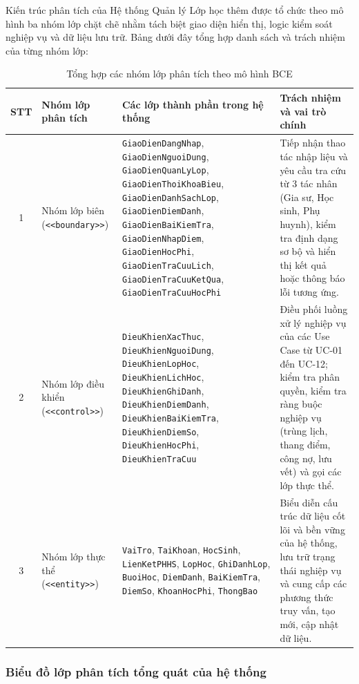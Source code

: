 \documentclass[12pt,a4paper]{article}
\begin{document}
Kiến trúc phân tích của Hệ thống Quản lý Lớp học thêm được tổ chức theo mô hình ba nhóm lớp chặt chẽ nhằm tách biệt giao diện hiển thị, logic kiểm soát nghiệp vụ và dữ liệu lưu trữ. Bảng dưới đây tổng hợp danh sách và trách nhiệm của từng nhóm lớp:

\begin{table}[htbp]
\centering
\caption{Tổng hợp các nhóm lớp phân tích theo mô hình BCE}
\begin{tabularx}{\textwidth}{@{}c >{\raggedright\arraybackslash}p{3.0cm} >{\raggedright\arraybackslash}X >{\raggedright\arraybackslash}X@{}}
\toprule
\textbf{STT} & \textbf{Nhóm lớp phân tích} & \textbf{Các lớp thành phần trong hệ thống} & \textbf{Trách nhiệm và vai trò chính} \\
\midrule
1 & Nhóm lớp biên (\texttt{<<boundary>>}) & \texttt{GiaoDienDangNhap}, \texttt{GiaoDienNguoiDung}, \texttt{GiaoDienQuanLyLop}, \texttt{GiaoDienThoiKhoaBieu}, \texttt{GiaoDienDanhSachLop}, \texttt{GiaoDienDiemDanh}, \texttt{GiaoDienBaiKiemTra}, \texttt{GiaoDienNhapDiem}, \texttt{GiaoDienHocPhi}, \texttt{GiaoDienTraCuuLich}, \texttt{GiaoDienTraCuuKetQua}, \texttt{GiaoDienTraCuuHocPhi} & Tiếp nhận thao tác nhập liệu và yêu cầu tra cứu từ 3 tác nhân (Gia sư, Học sinh, Phụ huynh), kiểm tra định dạng sơ bộ và hiển thị kết quả hoặc thông báo lỗi tương ứng. \\
\midrule
2 & Nhóm lớp điều khiển (\texttt{<<control>>}) & \texttt{DieuKhienXacThuc}, \texttt{DieuKhienNguoiDung}, \texttt{DieuKhienLopHoc}, \texttt{DieuKhienLichHoc}, \texttt{DieuKhienGhiDanh}, \texttt{DieuKhienDiemDanh}, \texttt{DieuKhienBaiKiemTra}, \texttt{DieuKhienDiemSo}, \texttt{DieuKhienHocPhi}, \texttt{DieuKhienTraCuu} & Điều phối luồng xử lý nghiệp vụ của các Use Case từ UC-01 đến UC-12; kiểm tra phân quyền, kiểm tra ràng buộc nghiệp vụ (trùng lịch, thang điểm, công nợ, lưu vết) và gọi các lớp thực thể. \\
\midrule
3 & Nhóm lớp thực thể (\texttt{<<entity>>}) & \texttt{VaiTro}, \texttt{TaiKhoan}, \texttt{HocSinh}, \texttt{LienKetPHHS}, \texttt{LopHoc}, \texttt{GhiDanhLop}, \texttt{BuoiHoc}, \texttt{DiemDanh}, \texttt{BaiKiemTra}, \texttt{DiemSo}, \texttt{KhoanHocPhi}, \texttt{ThongBao} & Biểu diễn cấu trúc dữ liệu cốt lõi và bền vững của hệ thống, lưu trữ trạng thái nghiệp vụ và cung cấp các phương thức truy vấn, tạo mới, cập nhật dữ liệu. \\
\bottomrule
\end{tabularx}
\end{table}

\subsubsection{Biểu đồ lớp phân tích tổng quát của hệ thống}
\end{document}
